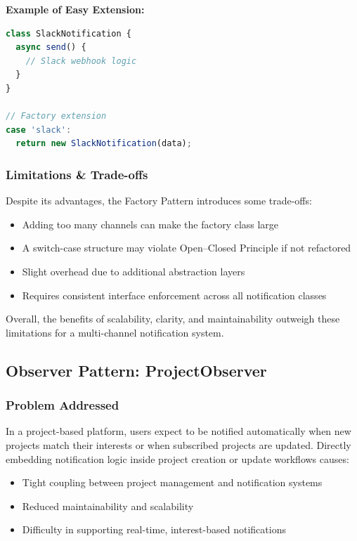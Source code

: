 \documentclass[a4paper,12pt]{report}
\begin{document}
\textbf{Example of Easy Extension:}
\begin{lstlisting}[language=JavaScript, numbers=none]
class SlackNotification {
  async send() {
    // Slack webhook logic
  }
}

// Factory extension
case 'slack':
  return new SlackNotification(data);
\end{lstlisting}

\subsubsection{Limitations \& Trade-offs}
Despite its advantages, the Factory Pattern introduces some trade-offs:
\begin{itemize}
    \item Adding too many channels can make the factory class large
    \item A switch-case structure may violate Open–Closed Principle if not refactored
    \item Slight overhead due to additional abstraction layers
    \item Requires consistent interface enforcement across all notification classes
\end{itemize}

Overall, the benefits of scalability, clarity, and maintainability outweigh these limitations for a multi-channel notification system.

\subsection{Observer Pattern: ProjectObserver}

\subsubsection{Problem Addressed}
In a project-based platform, users expect to be notified automatically when new projects match their interests or when subscribed projects are updated.  
Directly embedding notification logic inside project creation or update workflows causes:
\begin{itemize}
    \item Tight coupling between project management and notification systems
    \item Reduced maintainability and scalability
    \item Difficulty in supporting real-time, interest-based notifications
\end{itemize}
\end{document}
